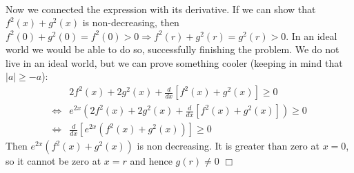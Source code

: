\begin{solution}[$\pi/2$]
\begin{align*}
    \end{align*}
    Now we connected the expression with its derivative. If we can show that $f^2(x)+g^2(x)$ is non-decreasing, then $f^2(0)+g^2(0)=f^2(0)>0 \Rightarrow f^2(r)+g^2(r)=g^2(r) >0$. In an ideal world we would be able to do so, successfully finishing the problem. We do not live in an ideal world, but we can prove something cooler (keeping in mind that $|a| \geq -a$):
    \begin{align*}
        &2f^2(x)+2g^2(x)+\frac{d}{dx}\left[ f^2(x)+g^2(x) \right] \geq 0 \\
        \iff &e^{2x} \left( 2f^2(x)+2g^2(x)+\frac{d}{dx}\left[ f^2(x)+g^2(x) \right] \right) \geq 0 \\
        \iff &\frac{d}{dx} \left [ e^{2x}(f^2(x)+g^2(x)) \right ] \geq 0
    \end{align*}
    Then $e^{2x}(f^2(x)+g^2(x))$ is non decreasing. It is greater than zero at $x=0$, so it cannot be zero at $x=r$ and hence $g(r) \neq 0$ $\Box$
\end{solution}

